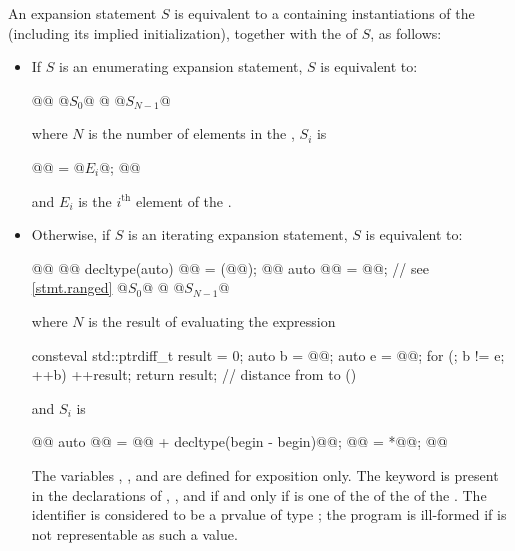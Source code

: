 \pnum
An expansion statement $S$ is equivalent to a 
containing instantiations of the 
(including its implied initialization),
together with the  of $S$, as follows:
\begin{itemize}
\item
If $S$ is an enumerating expansion statement, $S$ is equivalent to:
\begin{codeblock}
{
  @@
  @$S_{0}$@
  @\vdots@
  @$S_{N-1}$@
}
\end{codeblock}
where $N$ is the number of elements in the ,
$S_{i}$ is
\begin{codeblock}
{
  @@ = @$E_{i}$@;
  @@
}
\end{codeblock}
and $E_{i}$ is the $i^{\text{th}}$ element of the .

\item
Otherwise, if $S$ is an iterating expansion statement, $S$ is equivalent to:
\begin{codeblock}
{
  @@
  @@ decltype(auto) @@ = (@@);
  @@ auto @@ = @@;         // see \ref{stmt.ranged}
  @$S_{0}$@
  @\vdots@
  @$S_{N-1}$@
}
\end{codeblock}
where $N$ is the result of evaluating the expression
\begin{codeblock}
[&] consteval {
  std::ptrdiff_t result = 0;
  auto b = @@;
  auto e = @@;
  for (; b != e; ++b) ++result;
  return result;                                // distance from  to 
}()
\end{codeblock}
and $S_{i}$ is
\begin{codeblock}
{
  @@ auto @@ = @@ + decltype(begin - begin){@@};
  @@ = *@@;
  @@
}
\end{codeblock}
The variables , , and 
are defined for exposition only.
The keyword  is present in the declarations
of , , and 
if and only if
 is one of the  of
the  of
the .
The identifier  is considered to be
a prvalue of type ;
the program is ill-formed if
 is not representable as such a value.


\end{itemize}
